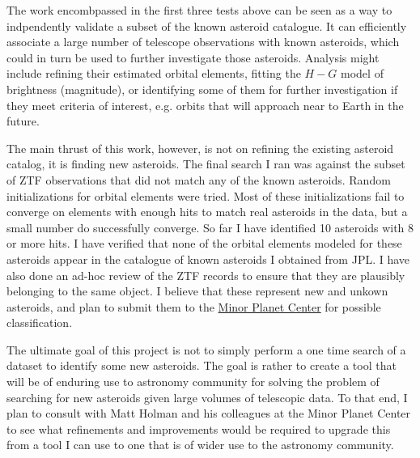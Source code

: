 The work encombpassed in the first three tests above can be seen as a way to indpendently validate a subset of the known asteroid catalogue.
It can efficiently associate a large number of telescope observations with known asteroids,
which could in turn be used to further investigate those asteroids.
Analysis might include refining their estimated orbital elements, 
fitting the $H-G$ model of brightness (magnitude), or identifying some of them for further investigation if they meet criteria of interest,
e.g. orbits that will approach near to Earth in the future.

The main thrust of this work, however, is not on refining the existing asteroid catalog, it is finding new asteroids.
The final search I ran was against the subset of ZTF observations that did not match any of the known asteroids.
Random initializations for orbital elements were tried.
Most of these initializations fail to converge on elements with enough hits to match real asteroids in the data,
but a small number do successfully converge.
So far I have identified 10 asteroids with 8 or more hits.
I have verified that none of the orbital elements modeled for these asteroids appear in the catalogue of known asteroids I obtained from JPL.
I have also done an ad-hoc review of the ZTF records to ensure that they are plausibly belonging to the same object.
I believe that these represent new and unkown asteroids, and plan to submit them to the 
\href{https://www.minorplanetcenter.net/iau/mpc.html}{Minor Planet Center} for possible classification.

The ultimate goal of this project is not to simply perform a one time search of a dataset to identify some new asteroids.
The goal is rather to create a tool that will be of enduring use to astronomy community for solving the problem of 
searching for new asteroids given large volumes of telescopic data.
To that end, I plan to consult with Matt Holman and his colleagues at the Minor Planet Center to see what refinements and improvements
would be required to upgrade this from a tool I can use to one that is of wider use to the astronomy community.

